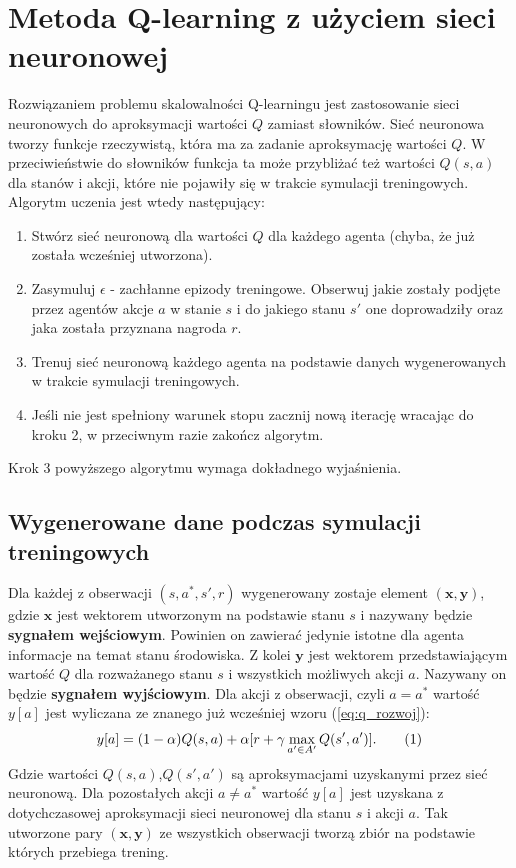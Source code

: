 \documentclass[12pt]{book}
\theoremstyle{plain}
\newcommand\addtag{\refstepcounter{equation}
\renewcommand{\labelenumii}{\theenumii}
\renewcommand{\theenumii}{\theenumi.\arabic{enumii}.}
\tag{\theequation}}
\newcommand{\myref}[1]{(\ref{#1})}
\begin{document}
\section{Metoda Q-learning z użyciem sieci neuronowej} \label{learning:DQN_single_agent}
Rozwiązaniem problemu skalowalności Q-learningu jest zastosowanie sieci neuronowych do aproksymacji wartości $Q$ zamiast słowników. Sieć neuronowa tworzy funkcje rzeczywistą, która ma za zadanie aproksymację wartości $Q$. W przeciwieństwie do słowników funkcja ta może przybliżać też wartości $Q(s,a)$ dla stanów i akcji, które nie pojawiły się w trakcie symulacji treningowych. Algorytm uczenia jest wtedy następujący:
\begin{enumerate}
	\item Stwórz sieć neuronową dla wartości $Q$ dla każdego agenta (chyba, że już została wcześniej utworzona).
	\item Zasymuluj $\epsilon$ - zachłanne epizody treningowe. Obserwuj jakie zostały podjęte przez agentów akcje $a$ w stanie $s$ i do jakiego stanu $s'$ one doprowadziły oraz jaka została przyznana nagroda $r$.
	\item Trenuj sieć neuronową każdego agenta na podstawie danych wygenerowanych w trakcie symulacji treningowych.
	\item Jeśli nie jest spełniony warunek stopu zacznij nową iterację wracając do kroku 2, w przeciwnym razie zakończ algorytm.
\end{enumerate}
Krok 3 powyższego algorytmu wymaga dokładnego wyjaśnienia.
\subsection{Wygenerowane dane podczas symulacji treningowych}
Dla każdej z obserwacji $(s,a^*,s',r)$ wygenerowany zostaje element $(\textbf{x},\textbf{y})$, gdzie $\textbf{x}$ jest wektorem utworzonym na podstawie stanu $s$ i nazywany będzie \textbf{sygnałem wejściowym}. Powinien on zawierać jedynie istotne dla agenta informacje na temat stanu środowiska. Z kolei $\textbf{y}$ jest wektorem przedstawiającym wartość $Q$ dla rozważanego stanu $s$ i wszystkich możliwych akcji $a$. Nazywany on będzie \textbf{sygnałem wyjściowym}. Dla akcji z obserwacji, czyli $a=a^*$ wartość $y[a]$ jest wyliczana ze znanego już wcześniej wzoru \myref{eq:q_rozwoj}:
\[ y[a]=(1-\alpha)Q(s,a) + \alpha [r + \gamma \max_{a' \in A'} Q(s',a')]. \addtag \]
Gdzie wartości $Q(s,a)$,$Q(s',a')$ są aproksymacjami uzyskanymi przez sieć neuronową. \newline \newline Dla pozostałych akcji $a \neq a^*$ wartość $y[a]$ jest uzyskana z dotychczasowej aproksymacji sieci neuronowej dla stanu $s$ i akcji $a$. Tak utworzone pary $(\textbf{x},\textbf{y})$ ze wszystkich obserwacji tworzą zbiór na podstawie których przebiega trening.
\end{document}
